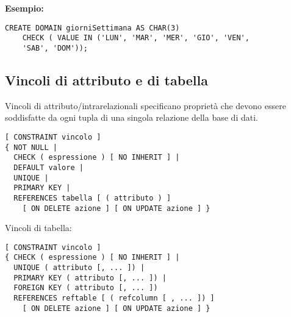 \documentclass[a4paper, 10pt]{article}
\begin{document}
	\textbf{Esempio:}
	\begin{lstlisting}
CREATE DOMAIN giorniSettimana AS CHAR(3)
	CHECK ( VALUE IN ('LUN', 'MAR', 'MER', 'GIO', 'VEN', 
	'SAB', 'DOM'));
	\end{lstlisting}

	\subsection{Vincoli di attributo e di tabella}
	Vincoli di attributo/intrarelazionali specificano proprietà che devono
	essere soddisfatte da ogni tupla di una singola relazione della base di
	dati.
	
	\begin{lstlisting}
[ CONSTRAINT vincolo ]
{ NOT NULL |
  CHECK ( espressione ) [ NO INHERIT ] |
  DEFAULT valore |
  UNIQUE |
  PRIMARY KEY |
  REFERENCES tabella [ ( attributo ) ]
    [ ON DELETE azione ] [ ON UPDATE azione ] }
	\end{lstlisting}
	
	Vincoli di tabella:
	\begin{lstlisting}
[ CONSTRAINT vincolo ]
{ CHECK ( espressione ) [ NO INHERIT ] |
  UNIQUE ( attributo [, ... ]) |
  PRIMARY KEY ( attributo [, ... ]) |
  FOREIGN KEY ( attributo [, ... ])
  REFERENCES reftable [ ( refcolumn [ , ... ]) ]
	[ ON DELETE azione ] [ ON UPDATE azione ] }
	\end{lstlisting}
\end{document}
